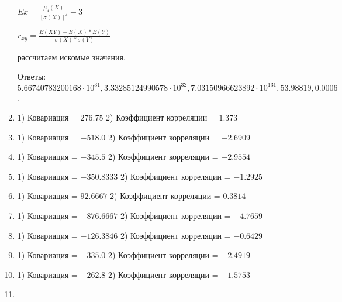 \documentclass[a4paper,12pt]{article}
\begin{document}
\begin{enumerate}
	$Ex = \frac{\mu_4(X)}{[\sigma(X)]^4} - 3$

	$r_{xy} = \frac{E(XY) - E(X) * E(Y)}{\sigma(X) * \sigma(Y)}$

    рассчитаем искомые значения.

    Ответы: $5.66740783200168 \cdot 10^{31}, 3.33285124990578 \cdot 10^{32}, 7.03150966623892 \cdot 10^{131}, 53.98819, 0.0006$.

    


\item


1) Ковариация = $276.75$
2) Коэффициент корреляции = $1.373$



\item


1) Ковариация = $-518.0$
2) Коэффициент корреляции = $-2.6909$



\item


1) Ковариация = $-345.5$
2) Коэффициент корреляции = $-2.9554$



\item


1) Ковариация = $-350.8333$
2) Коэффициент корреляции = $-1.2925$



\item


1) Ковариация = $92.6667$
2) Коэффициент корреляции = $0.3814$



\item


1) Ковариация = $-876.6667$
2) Коэффициент корреляции = $-4.7659$



\item


1) Ковариация = $-126.3846$
2) Коэффициент корреляции = $-0.6429$



\item


1) Ковариация = $-335.0$
2) Коэффициент корреляции = $-2.4919$



\item


1) Ковариация = $-262.8$
2) Коэффициент корреляции = $-1.5753$



\item



\end{enumerate}
\end{document}
